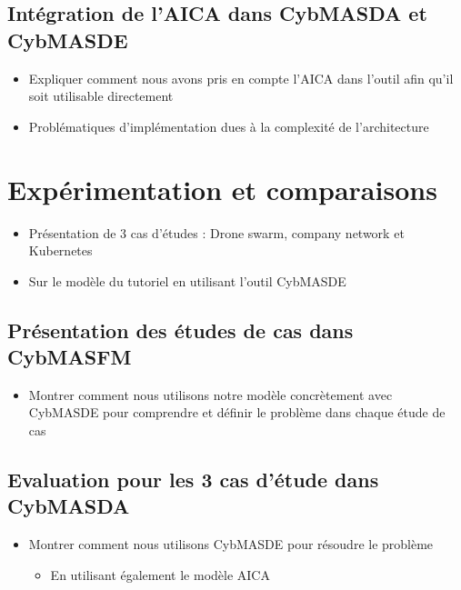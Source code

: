 \documentclass{article}
\begin{document}
\subsection{Intégration de l'AICA dans CybMASDA et CybMASDE}
\begin{itemize}

    \item Expliquer comment nous avons pris en compte l'AICA dans l'outil afin qu'il soit utilisable directement
    \item Problématiques d'implémentation dues à la complexité de l'architecture
\end{itemize}


\section{Expérimentation et comparaisons}
\begin{itemize}

    \item Présentation de 3 cas d’études : Drone swarm, company network et Kubernetes
    \item Sur le modèle du tutoriel en utilisant l'outil CybMASDE
\end{itemize}
\subsection{Présentation des études de cas dans CybMASFM}
\begin{itemize}

    \item Montrer comment nous utilisons notre modèle concrètement avec CybMASDE pour comprendre et définir le problème dans chaque étude de cas
\end{itemize}

\subsection{Evaluation pour les 3 cas d’étude dans CybMASDA}
\begin{itemize}

    \item Montrer comment nous utilisons CybMASDE pour résoudre le problème
          \begin{itemize}
              \item En utilisant également le modèle AICA
          \end{itemize}
\end{itemize}
\end{document}
